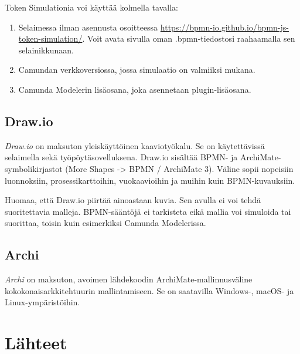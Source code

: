 \documentclass[
  finnish,
  letterpaper,
  DIV=11,
  numbers=noendperiod,
  oneside]{scrreprt}
\providecommand{\tightlist}{%
  \setlength{\itemsep}{0pt}\setlength{\parskip}{0pt}}
\begin{document}
Token Simulationia voi käyttää kolmella tavalla:

\begin{enumerate}
\def\labelenumi{\arabic{enumi}.}
\tightlist
\item
  Selaimessa ilman asennusta osoitteessa
  \url{https://bpmn-io.github.io/bpmn-js-token-simulation/}. Voit avata
  sivulla oman .bpmn-tiedostosi raahaamalla sen selainikkunaan.
\item
  Camundan verkkoversiossa, jossa simulaatio on valmiiksi mukana.
\item
  Camunda Modelerin lisäosana, joka asennetaan plugin-lisäosana.
\end{enumerate}

\section{Draw.io}\label{draw.io}

\emph{Draw.io} on maksuton yleiskäyttöinen kaaviotyökalu. Se on
käytettävissä selaimella sekä työpöytäsovelluksena. Draw.io sisältää
BPMN- ja ArchiMate-symbolikirjastot (More Shapes -\textgreater{} BPMN /
ArchiMate 3). Väline sopii nopeisiin luonnoksiin, prosessikarttoihin,
vuokaavioihin ja muihin kuin BPMN-kuvauksiin.

Huomaa, että Draw.io piirtää ainoastaan kuvia. Sen avulla ei voi tehdä
suoritettavia malleja. BPMN-sääntöjä ei tarkisteta eikä mallia voi
simuloida tai suorittaa, toisin kuin esimerkiksi Camunda Modelerissa.

\section{Archi}\label{archi}

\emph{Archi} on maksuton, avoimen lähdekoodin ArchiMate-mallinnusväline
kokokonaisarkkitehtuurin mallintamiseen. Se on saatavilla Windows-,
macOS- ja Linux-ympäristöihin.


\chapter*{Lähteet}\label{luxe4hteet}

\end{document}
